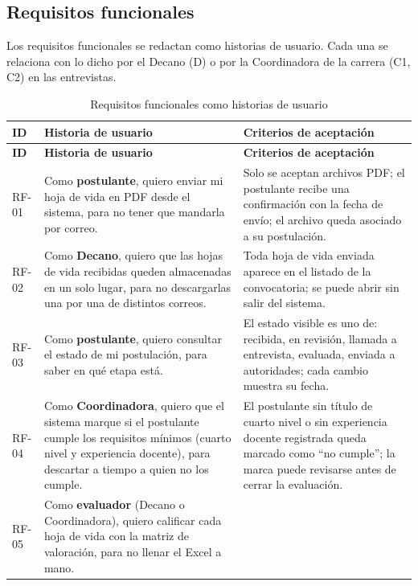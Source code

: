 \subsection{Requisitos funcionales}

Los requisitos funcionales se redactan como historias de usuario. Cada una se
relaciona con lo dicho por el Decano (D) o por la Coordinadora de la carrera (C1,
C2) en las entrevistas.

{\small
\begin{longtable}{@{}p{1.2cm}p{6.3cm}p{7.3cm}@{}}
\caption{Requisitos funcionales como historias de usuario}\\
\toprule
\textbf{ID} & \textbf{Historia de usuario} & \textbf{Criterios de aceptación} \\
\midrule
\endfirsthead
\toprule
\textbf{ID} & \textbf{Historia de usuario} & \textbf{Criterios de aceptación} \\
\midrule
\endhead
RF-01 & Como \textbf{postulante}, quiero enviar mi hoja de vida en PDF desde el sistema, para no tener que mandarla por correo. &
Solo se aceptan archivos PDF; el postulante recibe una confirmación con la fecha de envío; el archivo queda asociado a su postulación. \\
\midrule
RF-02 & Como \textbf{Decano}, quiero que las hojas de vida recibidas queden almacenadas en un solo lugar, para no descargarlas una por una de distintos correos. &
Toda hoja de vida enviada aparece en el listado de la convocatoria; se puede abrir sin salir del sistema. \\
\midrule
RF-03 & Como \textbf{postulante}, quiero consultar el estado de mi postulación, para saber en qué etapa está. &
El estado visible es uno de: recibida, en revisión, llamada a entrevista, evaluada, enviada a autoridades; cada cambio muestra su fecha. \\
\midrule
RF-04 & Como \textbf{Coordinadora}, quiero que el sistema marque si el postulante cumple los requisitos mínimos (cuarto nivel y experiencia docente), para descartar a tiempo a quien no los cumple. &
El postulante sin título de cuarto nivel o sin experiencia docente registrada queda marcado como \enquote{no cumple}; la marca puede revisarse antes de cerrar la evaluación. \\
\midrule
RF-05 & Como \textbf{evaluador} (Decano o Coordinadora), quiero calificar cada hoja de vida con la matriz de valoración, para no llenar el Excel a mano. &

\end{longtable}}

